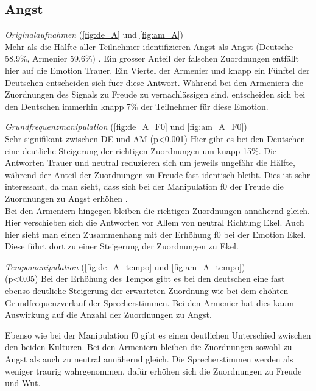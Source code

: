 \documentclass[11pt,a4paper,headsepline,twoside,toc=bibliography]{scrreprt}
\begin{document}
\subsection{Angst}
\label{sec:Angst}

\emph{Originalaufnahmen} (\autoref{fig:de_A} und \ref{fig:am_A}) \\
Mehr als die Hälfte aller Teilnehmer identifizieren Angst als Angst (Deutsche 58,9\%, Armenier 59,6\%) . Ein grosser Anteil der falschen Zuordnungen entfällt hier auf die Emotion Trauer. Ein Viertel der Armenier und knapp ein Fünftel der Deutschen entscheiden sich fuer diese Antwort. Während bei den Armeniern die Zuordnungen des Signals zu Freude zu vernachlässigen sind, entscheiden sich bei den Deutschen immerhin knapp 7\% der Teilnehmer für diese Emotion. 


\noindent
\emph{Grundfrequenzmanipulation} (\autoref{fig:de_A_F0} und \ref{fig:am_A_F0}) \\
Sehr signifikant zwischen DE und AM (p<0.001)
Hier gibt es bei den Deutschen eine deutliche Steigerung der richtigen Zuordnungen um knapp 15\%. Die Antworten Trauer und neutral reduzieren sich um jeweils ungefähr die Hälfte, während der Anteil der Zuordnungen zu Freude fast identisch bleibt. Dies ist sehr interessant, da man sieht, dass sich bei der Manipulation  f0 der Freude die Zuordnungen zu Angst erhöhen .\\
\noindent
Bei den Armeniern hingegen bleiben die richtigen Zuordnungen annähernd gleich. Hier verschieben sich die Antworten vor Allem von neutral Richtung Ekel.
Auch hier sieht man einen Zusammenhang mit der Erhöhung f0 bei der Emotion Ekel. Diese führt dort zu einer Steigerung der Zuordnungen zu Ekel.

\noindent
\emph{Tempomanipulation} (\autoref{fig:de_A_tempo} und \ref{fig:am_A_tempo}) \\
(p<0.05)
Bei der Erhöhung des Tempos gibt es bei den deutschen eine fast ebenso deutliche Steigerung der erwarteten Zuordnung wie bei dem ehöhten Grundfrequenzverlauf der Sprecherstimmen. Bei den Armenier hat dies kaum Auswirkung auf die Anzahl der Zuordnungen zu Angst.

Ebenso wie bei der Manipulation f0 gibt es einen deutlichen Unterschied zwischen den beiden Kulturen.
Bei den Armeniern bleiben die Zuordnungen sowohl zu Angst als auch zu neutral annähernd gleich. Die Sprecherstimmen werden als weniger traurig wahrgenommen, dafür erhöhen sich die Zuordnungen zu Freude und Wut.
\end{document}
